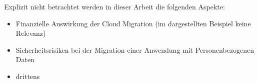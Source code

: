 Explizit nicht betrachtet werden in dieser Arbeit die folgenden Aspekte:
\begin{itemize}
\item Finanzielle Auswirkung der Cloud Migration (im dargestellten Beispiel keine Relevanz)
\item Sicherheitsrisiken bei der Migration einer Anwendung mit Personenbezogenen Daten
\item drittens
\end{itemize}

\pagebreak



